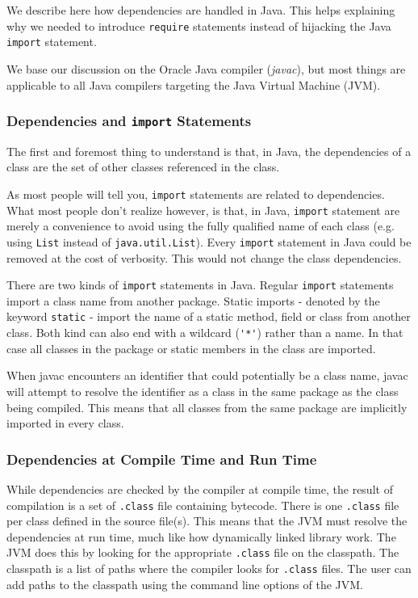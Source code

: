 We describe here how dependencies are handled in Java. This helps explaining why
we needed to introduce \texttt{require} statements instead of hijacking the Java
\texttt{import} statement.

We base our discussion on the Oracle Java compiler (\emph{javac}), but most
things are applicable to all Java compilers targeting the Java Virtual Machine
(JVM).

\subsubsection{Dependencies and \texttt{import} Statements}

The first and foremost thing to understand is that, in Java, the dependencies of
a class are the set of other classes referenced in the class.

As most people will tell you, \texttt{import} statements are related to
dependencies. What most people don't realize however, is that, in Java,
\texttt{import} statement are merely a convenience to avoid using the fully
qualified name of each class (e.g. using \texttt{List} instead of
\texttt{java.util.List}). Every \texttt{import} statement in Java could be
removed at the cost of verbosity. This would not change the class dependencies.

There are two kinds of \texttt{import} statements in Java. Regular
\texttt{import} statements import a class name from another package. Static
imports - denoted by the keyword \texttt{static} - import the name of a static
method, field or class from another class. Both kind can also end with a
wildcard (\lstinline{'*'}) rather than a name. In that case all classes in the
package or static members in the class are imported.

When javac encounters an identifier that could potentially be a class name,
javac will attempt to resolve the identifier as a class in the same package as
the class being compiled. This means that all classes from the same package are
implicitly imported in every class.

\subsubsection{Dependencies at Compile Time and Run Time}

While dependencies are checked by the compiler at compile time, the result of
compilation is a set of \texttt{.class} file containing bytecode. There is one
\texttt{.class} file per class defined in the source file(s). This means that
the JVM must resolve the dependencies at run time, much like how dynamically
linked library work. The JVM does this by looking for the appropriate
\texttt{.class} file on the classpath. The classpath is a list of paths where
the compiler looks for \texttt{.class} files. The user can add paths to the
classpath using the command line options of the JVM.

